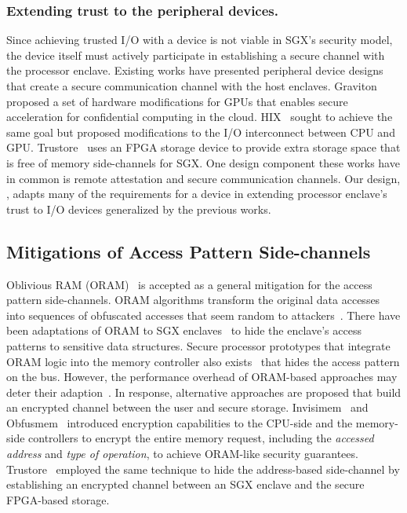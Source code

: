 \subsubsection{Extending trust to the peripheral devices.}
Since achieving trusted I/O with a device is not viable in SGX's security model, the device itself must actively participate in establishing a secure channel with the processor enclave. Existing works have presented peripheral device designs that create a secure communication channel with the host enclaves. Graviton~\cite{graviton} proposed a set of hardware modifications for GPUs that enables secure acceleration for confidential computing in the cloud. HIX~\cite{hix} sought to achieve the same goal but proposed modifications to the I/O interconnect between CPU and GPU. Trustore~\cite{trustore} uses an FPGA storage device to provide extra storage space that is free of memory side-channels for SGX. One design component these works have in common is remote attestation and secure communication channels. Our design, \thename, adapts many of the requirements for a device in extending processor enclave's trust to I/O devices generalized by the previous works.  

\subsection{Mitigations of Access Pattern Side-channels}
\label{subsec:oram}
Oblivious RAM (ORAM)~\cite{path-oram,ring-oram,freecursive-oram} is accepted as a general mitigation for the access pattern side-channels. ORAM algorithms transform the original data accesses into sequences of obfuscated accesses that seem random to attackers~\cite{ring-oram}. There have been adaptations of ORAM to SGX enclaves~\cite{zerotrace,obfuscuro} to hide the enclave's access patterns to sensitive data structures. Secure processor prototypes that integrate ORAM logic into the memory controller also exists~\cite{freecursive-oram,ascend} that hides the access pattern on the bus. However, the performance overhead of ORAM-based approaches may deter their adaption~\cite{zerotrace}. In response, alternative approaches are proposed that build an encrypted channel between the user and secure storage. Invisimem~\cite{invisimem} and Obfusmem~\cite{obfusmem} introduced encryption capabilities to the CPU-side and the memory-side controllers to encrypt the entire memory request, including the \emph{accessed address} and \emph{type of operation}, to achieve ORAM-like security guarantees. Trustore~\cite{trustore} employed the same technique to hide the address-based side-channel by establishing an encrypted channel between an SGX enclave and the secure FPGA-based storage. 
